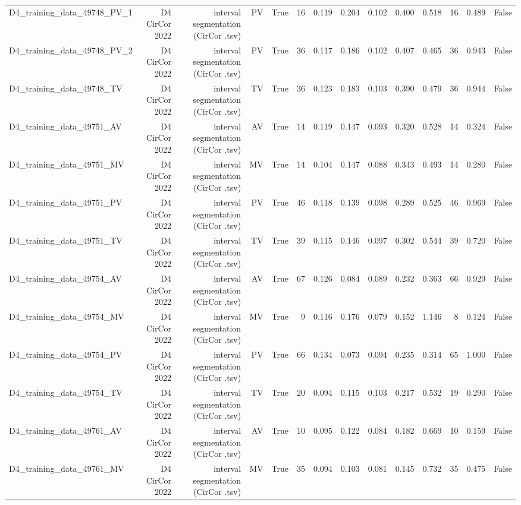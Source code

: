 \begin{table}[htbp]
\begin{tabular}{lrrrrrrrrrrrrr}
    D4\_training\_data\_49748\_PV\_1 & D4 CirCor 2022 & interval segmentation (CirCor .tsv) & PV & True & 16 & 0.119 & 0.204 & 0.102 & 0.400 & 0.518 & 16 & 0.489 & False \\
    D4\_training\_data\_49748\_PV\_2 & D4 CirCor 2022 & interval segmentation (CirCor .tsv) & PV & True & 36 & 0.117 & 0.186 & 0.102 & 0.407 & 0.465 & 36 & 0.943 & False \\
    D4\_training\_data\_49748\_TV & D4 CirCor 2022 & interval segmentation (CirCor .tsv) & TV & True & 36 & 0.123 & 0.183 & 0.103 & 0.390 & 0.479 & 36 & 0.944 & False \\
    D4\_training\_data\_49751\_AV & D4 CirCor 2022 & interval segmentation (CirCor .tsv) & AV & True & 14 & 0.119 & 0.147 & 0.093 & 0.320 & 0.528 & 14 & 0.324 & False \\
    D4\_training\_data\_49751\_MV & D4 CirCor 2022 & interval segmentation (CirCor .tsv) & MV & True & 14 & 0.104 & 0.147 & 0.088 & 0.343 & 0.493 & 14 & 0.280 & False \\
    D4\_training\_data\_49751\_PV & D4 CirCor 2022 & interval segmentation (CirCor .tsv) & PV & True & 46 & 0.118 & 0.139 & 0.098 & 0.289 & 0.525 & 46 & 0.969 & False \\
    D4\_training\_data\_49751\_TV & D4 CirCor 2022 & interval segmentation (CirCor .tsv) & TV & True & 39 & 0.115 & 0.146 & 0.097 & 0.302 & 0.544 & 39 & 0.720 & False \\
    D4\_training\_data\_49754\_AV & D4 CirCor 2022 & interval segmentation (CirCor .tsv) & AV & True & 67 & 0.126 & 0.084 & 0.089 & 0.232 & 0.363 & 66 & 0.929 & False \\
    D4\_training\_data\_49754\_MV & D4 CirCor 2022 & interval segmentation (CirCor .tsv) & MV & True & 9 & 0.116 & 0.176 & 0.079 & 0.152 & 1.146 & 8 & 0.124 & False \\
    D4\_training\_data\_49754\_PV & D4 CirCor 2022 & interval segmentation (CirCor .tsv) & PV & True & 66 & 0.134 & 0.073 & 0.094 & 0.235 & 0.314 & 65 & 1.000 & False \\
    D4\_training\_data\_49754\_TV & D4 CirCor 2022 & interval segmentation (CirCor .tsv) & TV & True & 20 & 0.094 & 0.115 & 0.103 & 0.217 & 0.532 & 19 & 0.290 & False \\
    D4\_training\_data\_49761\_AV & D4 CirCor 2022 & interval segmentation (CirCor .tsv) & AV & True & 10 & 0.095 & 0.122 & 0.084 & 0.182 & 0.669 & 10 & 0.159 & False \\
    D4\_training\_data\_49761\_MV & D4 CirCor 2022 & interval segmentation (CirCor .tsv) & MV & True & 35 & 0.094 & 0.103 & 0.081 & 0.145 & 0.732 & 35 & 0.475 & False \\

\end{tabular}
\end{table}
